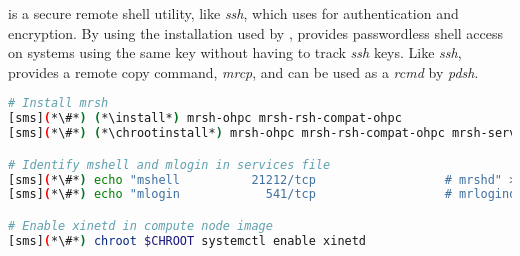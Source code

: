 \mrsh{} is a secure remote shell utility, like {\em ssh}, which uses
\MUNGE{} for authentication and encryption. By using the \MUNGE{}
installation used by \SLURM{}, \mrsh{} provides passwordless shell
access on systems using the same \MUNGE{} key without having to track
{\em ssh} keys. Like {\em ssh}, \mrsh{} provides a remote copy command,
{\em mrcp}, and can be used as a {\em rcmd} by {\em pdsh}.

\begin{lstlisting}[language=bash,keywords={},upquote=true]
# Install mrsh
[sms](*\#*) (*\install*) mrsh-ohpc mrsh-rsh-compat-ohpc
[sms](*\#*) (*\chrootinstall*) mrsh-ohpc mrsh-rsh-compat-ohpc mrsh-server-ohpc

# Identify mshell and mlogin in services file
[sms](*\#*) echo "mshell          21212/tcp                  # mrshd" >> /etc/services
[sms](*\#*) echo "mlogin            541/tcp                  # mrlogind" >> /etc/services

# Enable xinetd in compute node image
[sms](*\#*) chroot $CHROOT systemctl enable xinetd
\end{lstlisting}

